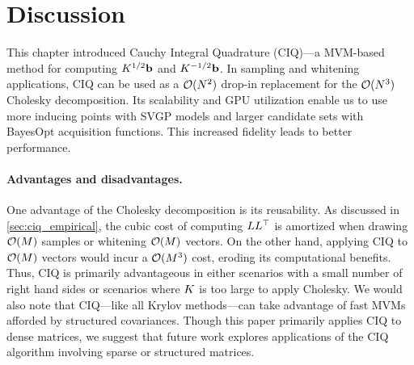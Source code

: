 \section{Discussion}

This chapter introduced Cauchy Integral Quadrature (CIQ)---a MVM-based method for computing $K^{1/2} \mathbf{b}$ and $K^{-1/2} \mathbf{b}$.
In sampling and whitening applications, CIQ can be used as a $\bigo{N^2}$ drop-in replacement for the $\bigo{N^3}$ Cholesky decomposition.
Its scalability and GPU utilization enable us to use more inducing points with SVGP models and larger candidate sets with BayesOpt acquisition functions.
This increased fidelity leads to better performance.


\paragraph{Advantages and disadvantages.}
One advantage of the Cholesky decomposition is its reusability.
As discussed in \cref{sec:ciq_empirical}, the cubic cost of computing $L L^\top$ is amortized when drawing $\bigo{M}$ samples or whitening $\bigo{M}$ vectors.
On the other hand, applying CIQ to $\bigo{M}$ vectors would incur a $\bigo{M^3}$ cost, eroding its computational benefits. Thus, CIQ is primarily advantageous
in either scenarios with a small number of right hand sides or scenarios where $K$ is too large to apply Cholesky.
We would also note that CIQ---like all Krylov methods---can take advantage of fast MVMs afforded by structured covariances.
Though this paper primarily applies CIQ to dense matrices, we suggest that future work explores applications of the CIQ algorithm involving sparse or structured matrices.


